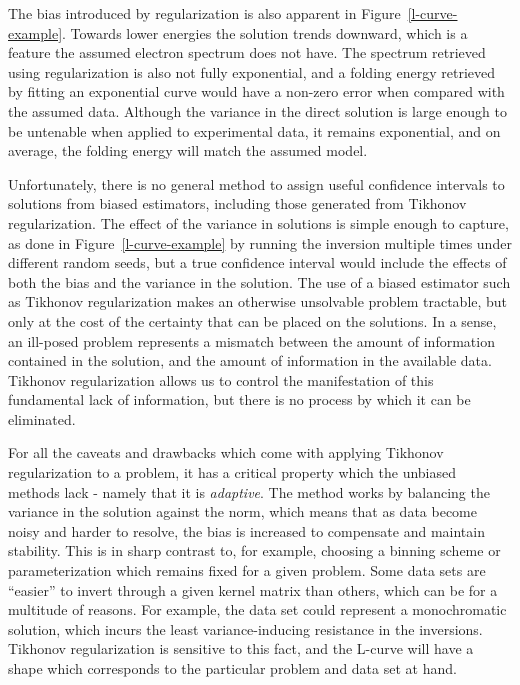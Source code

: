 The bias introduced by regularization is also apparent in Figure~\ref{l-curve-example}. Towards lower energies the solution trends downward, which is a feature the assumed electron spectrum does not have. The spectrum retrieved using regularization is also not fully exponential, and a folding energy retrieved by fitting an exponential curve would have a non-zero error when compared with the assumed data. Although the variance in the direct solution is large enough to be untenable when applied to experimental data, it remains exponential, and on average, the folding energy will match the assumed model. 

Unfortunately, there is no general method to assign useful confidence intervals to solutions from biased estimators, including those generated from Tikhonov regularization. The effect of the variance in solutions is simple enough to capture, as done in Figure~\ref{l-curve-example} by running the inversion multiple times under different random seeds, but a true confidence interval would include the effects of both the bias and the variance in the solution. The use of a biased estimator such as Tikhonov regularization  makes an otherwise unsolvable problem tractable, but only at the cost of the certainty that can be placed on the solutions. In a sense, an ill-posed problem represents a mismatch between the amount of information contained in the solution, and the amount of information in the available data. Tikhonov regularization allows us to control the manifestation of this fundamental lack of information, but there is no process by which it can be eliminated. 

For all the caveats and drawbacks which come with applying Tikhonov regularization to a problem, it has a critical property which the unbiased methods lack - namely that it is \textit{adaptive}. The method works by balancing the variance in the solution against the norm, which means that as data become noisy and harder to resolve, the bias is increased to compensate and maintain stability. This is in sharp contrast to, for example, choosing a binning scheme or parameterization which remains fixed for a given problem. Some data sets are ``easier'' to invert through a given kernel matrix than others, which can be for a multitude of reasons. For example, the data set could represent a monochromatic solution, which incurs the least variance-inducing resistance in the inversions. Tikhonov regularization is sensitive to this fact, and the L-curve will have a shape which corresponds to the particular problem and data set at hand. 

